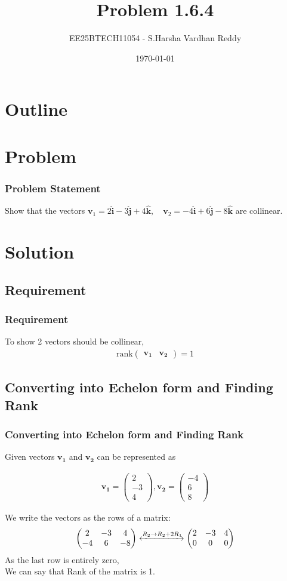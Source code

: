 \documentclass{beamer}
\title{Problem 1.6.4}
\author{EE25BTECH11054 - S.Harsha Vardhan Reddy}
\date{\today}
\theoremstyle{remark}
\newcommand{\myvec}[1]{\ensuremath{\begin{pmatrix}#1\end{pmatrix}}}
\let\vec\mathbf
\numberwithin{equation}{section}
\begin{document}
\begin{frame}
\titlepage
\end{frame}

\section*{Outline}
\begin{frame}
\tableofcontents
\end{frame}
\section{Problem}
\begin{frame}
\frametitle{Problem Statement}
%
Show that the vectors 
$\vec{v}_1 = 2\hat{\vec{i}} - 3\hat{\vec{j}} + 4\hat{\vec{k}}, \quad \vec{v}_2 = -4\hat{\vec{i}} + 6\hat{\vec{j}} - 8\hat{\vec{k}}$
are collinear.
 
\end{frame}

\section{Solution}
\subsection{Requirement}
\setcounter{section}{1}
\begin{frame}
\frametitle{Requirement}
To show 2 vectors should be collinear,
\begin{align}
\text{rank}\myvec{\vec{v_1} & \vec{v_2}} = 1
\end{align}
\end{frame}
\subsection{Converting into Echelon form and Finding Rank}
\begin{frame}
\frametitle{Converting into Echelon form and Finding Rank}
Given vectors $\vec{v_1}$ and $\vec{v_2}$ can be represented as

\begin{align}
\vec{v_1}=\myvec{2 \\ -3 \\ 4 } , \vec{v_2}=\myvec{-4 \\ 6 \\8 }
\end{align}

We write the vectors as the rows of a matrix:
\begin{align}
   \myvec{
2 & -3 & 4 \\ -4 & 6 & -8 } \xleftrightarrow{R_2 \rightarrow R_2 + 2R_1} \myvec{2 & -3 & 4 \\ 0 & 0 & 0}
\end{align}
As the last row is entirely zero,
\\ We can say that Rank of the matrix is 1.
\end{frame}
\end{document}
